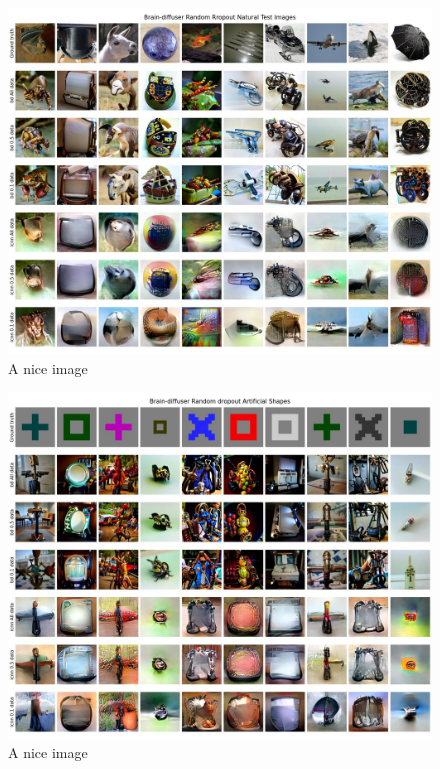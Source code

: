 \begin{figure}[ht]
    \centering
    \includegraphics[width=1\textwidth]{plots/dropout_qual_random_test.JPEG}
    \caption{A nice image}\label{fig:dropout_qual_random_test}
\end{figure}

\begin{figure}[ht]
    \centering
    \includegraphics[width=1\textwidth]{plots/dropout_qual_random_art.JPEG}
    \caption{A nice image}\label{fig:dropout_qual_random_art}
\end{figure}


